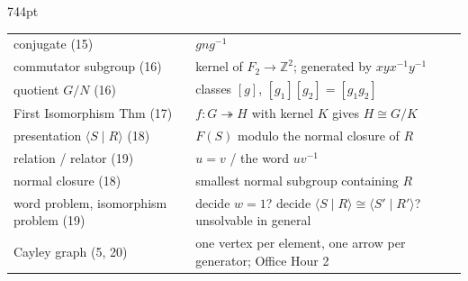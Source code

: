 \documentclass[10pt]{article}
\newcommand{\Z}{\mathbb{Z}}
\newcommand{\inv}{^{-1}}
\begin{document}
\begin{textblock*}{744pt}
\begin{minipage}[t]{345pt}
\begin{tabular}{@{}p{95pt}p{245pt}@{}}
conjugate (15) & $gng\inv$\\
commutator subgroup (16) & kernel of $F_2\to\Z^2$; generated by $xyx\inv y\inv$\\
quotient $G/N$ (16) & classes $[g]$, $[g_1][g_2]=[g_1g_2]$\\
First Isomorphism Thm (17) & $f:G\twoheadrightarrow H$ with kernel $K$ gives $H\cong G/K$\\
presentation $\langle S\mid R\rangle$ (18) & $F(S)$ modulo the normal closure of $R$\\
relation / relator (19) & $u=v$ / the word $uv\inv$\\
normal closure (18) & smallest normal subgroup containing $R$\\
word problem, isomorphism problem (19) & decide $w=1$? decide $\langle S\mid R\rangle\cong\langle S'\mid R'\rangle$? unsolvable in general\\
Cayley graph (5, 20) & one vertex per element, one arrow per generator; Office Hour 2\\
\end{tabular}
\end{minipage}
\end{textblock*}
\mbox{}\clearpage
\end{document}
